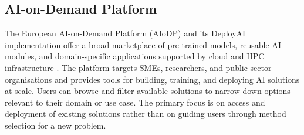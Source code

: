 \subsection{AI-on-Demand Platform}
The European AI-on-Demand Platform (AIoDP) and its 
DeployAI implementation offer a broad marketplace of 
pre-trained models, reusable AI modules, and 
domain-specific applications supported by cloud 
and HPC infrastructure 
\parencite{troumpoukis2025deployai_ai_on_demand_platform}. 
The platform targets SMEs, researchers, and public 
sector organisations and provides tools for building, 
training, and deploying AI solutions at scale. 
Users can browse and filter available solutions 
to narrow down options relevant to their domain 
or use case. The primary focus is on access and 
deployment of existing solutions rather than on 
guiding users through method selection for a 
new problem.